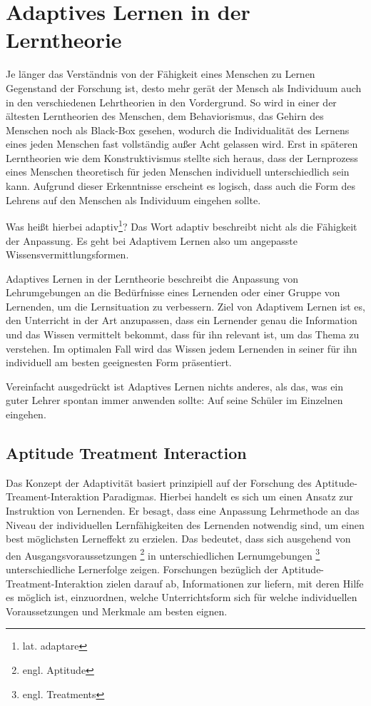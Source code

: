\chapter{Adaptives Lernen in der Lerntheorie}
Je länger das Verständnis von der Fähigkeit eines Menschen zu Lernen Gegenstand der Forschung ist,
desto mehr gerät der Mensch als Individuum auch in den verschiedenen Lehrtheorien in den Vordergrund.
So wird in einer der ältesten Lerntheorien des Menschen, dem Behaviorismus, das Gehirn des Menschen noch als
Black-Box gesehen, wodurch die Individualität des Lernens eines jeden Menschen fast vollständig außer Acht gelassen wird.
Erst in späteren Lerntheorien wie dem Konstruktivismus stellte sich heraus, dass der Lernprozess eines Menschen
theoretisch für jeden Menschen individuell unterschiedlich sein kann.
Aufgrund dieser Erkenntnisse erscheint es logisch, dass auch die Form des Lehrens auf den Menschen als Individuum eingehen sollte.

Was heißt hierbei adaptiv\footnote{lat. adaptare}?
Das Wort adaptiv beschreibt nicht als die Fähigkeit der Anpassung.
Es geht bei Adaptivem Lernen also um angepasste Wissensvermittlungsformen.

Adaptives Lernen in der Lerntheorie beschreibt die Anpassung von Lehrumgebungen
an die Bedürfnisse eines Lernenden oder einer Gruppe von Lernenden, um die Lernsituation
zu verbessern. Ziel von Adaptivem Lernen ist es, den Unterricht in der Art anzupassen,
dass ein Lernender genau die Information und das Wissen vermittelt bekommt, dass für ihn relevant ist,
um das Thema zu verstehen. Im optimalen Fall wird das Wissen jedem Lernenden
in seiner für ihn individuell am besten geeignesten Form präsentiert.

Vereinfacht ausgedrückt ist Adaptives Lernen nichts anderes, als das, was ein guter Lehrer
spontan immer anwenden sollte: Auf seine Schüler im Einzelnen eingehen.

\section{Aptitude Treatment Interaction}
Das Konzept der Adaptivität basiert prinzipiell auf der Forschung des Aptitude-Treament-Interaktion Paradigmas.
Hierbei handelt es sich um einen Ansatz zur Instruktion von Lernenden.
Er besagt, dass eine Anpassung Lehrmethode an das Niveau der individuellen Lernfähigkeiten
des Lernenden notwendig sind, um einen best möglichsten Lerneffekt zu erzielen.
Das bedeutet, dass sich ausgehend von den Ausgangsvoraussetzungen \footnote{engl. Aptitude}
in unterschiedlichen Lernumgebungen \footnote{engl. Treatments} unterschiedliche Lernerfolge zeigen.
Forschungen bezüglich der Aptitude-Treatment-Interaktion zielen darauf ab, Informationen
zur liefern, mit deren Hilfe es möglich ist, einzuordnen, welche Unterrichtsform sich
für welche individuellen Voraussetzungen und Merkmale am besten eignen.\cite[S. 203]{krohne2007psychologische}

